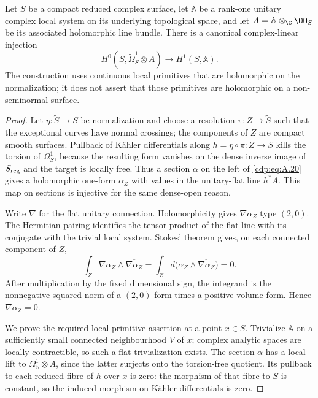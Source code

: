 
\begin{proposition}\label{cdp:st:A.4.7}
Let $S$ be a compact reduced complex surface, let $\mathbb A$ be a rank-one unitary complex local system on its underlying topological space, and let $A=\mathbb A\otimes_{\C}\OO_S$ be its associated holomorphic line bundle. There is a canonical complex-linear injection
\[
 H^0(S,\widetilde\Omega_S^1\otimes A)
       \longrightarrow H^1(S,\mathbb A).
 \tag{A.20}\label{cdp:eq:A.20}
\]
The construction uses continuous local primitives that are holomorphic on the normalization; it does not assert that those primitives are holomorphic on a non-seminormal surface.
\end{proposition}
\begin{proof}
Let $\eta:\widetilde S\to S$ be normalization and choose a resolution $\pi:Z\to\widetilde S$ such that the exceptional curves have normal crossings; the components of $Z$ are compact smooth surfaces. Pullback of Kähler differentials along $h=\eta\circ\pi:Z\to S$ kills the torsion of $\Omega_S^1$, because the resulting form vanishes on the dense inverse image of $S_{\rm reg}$ and the target is locally free. Thus a section $\alpha$ on the left of \eqref{cdp:eq:A.20} gives a holomorphic one-form $\alpha_Z$ with values in the unitary-flat line $h^*A$. This map on sections is injective for the same dense-open reason.

Write $\nabla$ for the flat unitary connection. Holomorphicity gives $\nabla\alpha_Z$ type $(2,0)$. The Hermitian pairing identifies the tensor product of the flat line with its conjugate with the trivial local system. Stokes' theorem gives, on each connected component of $Z$,
\[
 \int_Z \nabla\alpha_Z\wedge\overline{\nabla\alpha_Z}
 =\int_Z d\bigl(\alpha_Z\wedge\overline{\nabla\alpha_Z}\bigr)=0.
\]
After multiplication by the fixed dimensional sign, the integrand is the nonnegative squared norm of a $(2,0)$-form times a positive volume form. Hence $\nabla\alpha_Z=0$.

We prove the required local primitive assertion at a point $x\in S$. Trivialize $\mathbb A$ on a sufficiently small connected neighbourhood $V$ of $x$; complex analytic spaces are locally contractible, so such a flat trivialization exists. The section $\alpha$ has a local lift to $\Omega_S^1\otimes A$, since the latter surjects onto the torsion-free quotient. Its pullback to each reduced fibre of $h$ over $x$ is zero: the morphism of that fibre to $S$ is constant, so the induced morphism on Kähler differentials is zero.


\end{proof}
